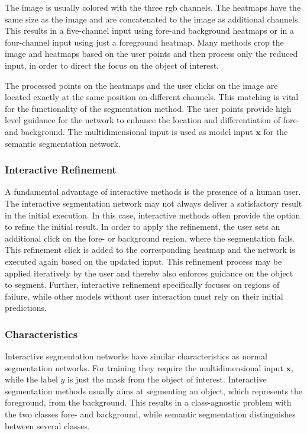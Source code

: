 The image is usually colored with the three \gls{rgb} channels.
The heatmaps have the same size as the image and are concatenated to the image as additional channels.
This results in a five-channel input using fore-and background heatmaps or in a four-channel input using just a foreground heatmap.
Many methods \cite{Man18-DEXTR} \cite{Zha20-IOG} crop the image and heatmaps based on the user points and then process only the reduced input, in order to direct the focus on the object of interest.

The processed points on the heatmaps and the user clicks on the image are located exactly at the same position on different channels.
This matching is vital for the functionality of the segmentation method.
The user points provide high level guidance for the network to enhance the location and differentiation of fore- and background.
The multidimensional input is used as model input $\textbf{x}$ for the semantic segmentation network.


\subsubsection{Interactive Refinement}
A fundamental advantage of interactive methods is the presence of a human user.
The interactive segmentation network may not always deliver a satisfactory result in the initial execution.
In this case, interactive methods often provide the option to refine the initial result.
In order to apply the refinement, the user sets an additional click on the fore- or background region, where the segmentation fails.
This refinement click is added to the corresponding heatmap and the network is executed again based on the updated input.
This refinement process may be applied iteratively by the user and thereby also enforces guidance on the object to segment.
Further, interactive refinement specifically focuses on regions of failure, while other models without user interaction must rely on their initial predictions.


\subsubsection{Characteristics}
Interactive segmentation networks have similar characteristics as normal segmentation networks.
For training they require the multidimensional input $\textbf{x}$, while the label $y$ is just the mask from the object of interest.
Interactive segmentation methods usually aims at segmenting an object, which represents the foreground, from the background.
This results in a class-agnostic problem with the two classes fore- and background, while semantic segmentation distinguishes between several classes.

